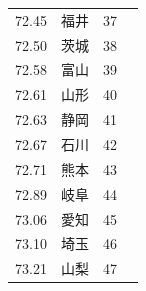 \begin{table}[ht]
\begin{tabular}{rrlr}
 72.45 & 福井 &  37 \\
 72.50 & 茨城 &  38 \\
 72.58 & 富山 &  39 \\
 72.61 & 山形 &  40 \\
 72.63 & 静岡 &  41 \\
 72.67 & 石川 &  42 \\
 72.71 & 熊本 &  43 \\
 72.89 & 岐阜 &  44 \\
 73.06 & 愛知 &  45 \\
 73.10 & 埼玉 &  46 \\
 73.21 & 山梨 &  47 \\
   \hline
\end{tabular}
\end{table}








